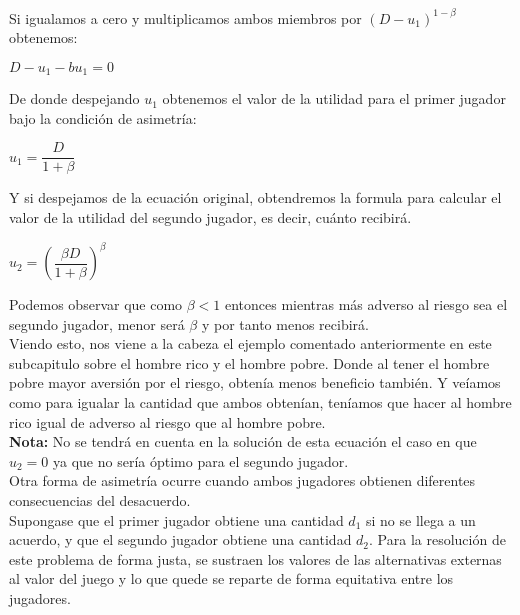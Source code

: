 \documentclass[10pt,a4paper]{book}
\begin{document}
Si igualamos a cero y multiplicamos ambos miembros por $(D-u_1)^{1-\beta}$ obtenemos:\\

\begin{center}

$D-u_1-bu_1=0$

\end{center}

De donde despejando $u_1$ obtenemos el valor de la utilidad para el primer jugador bajo la condición de asimetría:\\


\begin{center}

$u_1=\dfrac{D}{1+\beta}$

\end{center}

Y si despejamos de la ecuación original, obtendremos la formula para calcular el valor de la utilidad del segundo jugador, es decir, cuánto recibirá.\\


\begin{center}

$u_2=(\dfrac{\beta D}{1+\beta})^\beta$

\end{center}

Podemos observar que como $\beta<1$ entonces mientras más adverso al riesgo sea el segundo jugador, menor será $\beta$ y por tanto menos recibirá.\\

Viendo esto, nos viene a la cabeza el ejemplo comentado anteriormente en este subcapitulo sobre el hombre rico y el hombre pobre. Donde al tener el hombre pobre mayor aversión por el riesgo, obtenía menos beneficio también. Y veíamos como para igualar la cantidad que ambos obtenían, teníamos que hacer al hombre rico igual de adverso al riesgo que al hombre pobre.\\

\textbf{Nota:} No se tendrá en cuenta en la solución de esta ecuación el caso en que $u_2=0$ ya que no sería óptimo para el segundo jugador.\\


Otra forma de asimetría ocurre cuando ambos jugadores obtienen diferentes consecuencias del desacuerdo.\\

Supongase que el primer jugador obtiene una cantidad $d_1$ si no se llega a un acuerdo, y que el segundo jugador obtiene una cantidad $d_2$. Para la resolución de este problema de forma justa, se sustraen los valores de las alternativas externas al valor del juego y lo que quede se reparte de forma equitativa entre los jugadores.\\
\end{document}
